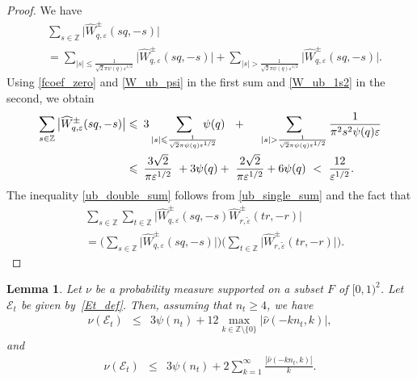 \documentclass[12pt, reqno]{amsart}
\newtheorem{lemma}[thm]{Lemma}
\theoremstyle{definition}
\theoremstyle{remark}
\numberwithin{equation}{section}
\newcommand{\I}{[0,1)}
\def\le{\leqslant} \def\ge{\geqslant}
\def\leq{\leqslant}
\def\geq{\geqslant}
\def \bZ {\mathbb Z}
\def \cE {\mathcal E}
\begin{document}
\begin{proof}
We have
\begin{align*}
&\sum_{s \in \bZ}
\big|\widehat{W}_{q,\varepsilon}^{\pm}(sq,-s)\big| \\
&=
\sum_{|s| \le \frac{1}{\sqrt{2}\pi\psi(q)\varepsilon^{1/2}}}  \big|\widehat{W}_{q,\varepsilon}^{\pm}(sq,-s)\big| +
\sum_{|s| > \frac{1}{\sqrt{2}\pi\psi(q)
		\varepsilon^{1/2}}}     
\big|\widehat{W}_{q,\varepsilon}^{\pm}(sq,-s)\big|.
\end{align*}
Using \eqref{fcoef_zero} and \eqref{W_ub_psi} in the first sum and \eqref{W_ub_1s2}
in the second, we obtain
\begin{equation*} 
\begin{aligned}
	\sum_{s \in \bZ}
	\big|\widehat{W}_{q,\varepsilon}^{\pm}(sq,-s)\big| &\leq    
	\: 3 
	\sum_{|s| \le \frac{1}{\sqrt{2}\pi\psi(q)
			\varepsilon^{1/2}}}   \hspace{-5mm} \psi(q)  \ \ + 
	\hspace*{3ex}  
	\sum_{|s| >
		\frac{1}{\sqrt{2}\pi\psi(q)
			\varepsilon^{1/2}}} 
	\frac{1}{\pi^2 s^2\psi(q)\varepsilon} \\
	&\leq \:
	\frac{3 \sqrt{2}}{\pi\varepsilon^{1/2}}  \ + 3\psi(q) + \ \frac{ 2 \sqrt{2}}{\pi\varepsilon^{1/2}} + 6\psi(q) \ <  \  \frac{12}{\varepsilon^{1/2}}.
\end{aligned}
\end{equation*}
The inequality \eqref{ub_double_sum} follows from \eqref{ub_single_sum} and the fact that 
\begin{align*}
&\sum_{s\in \bZ} \sum_{t\in \bZ}  \big|\widehat{W}_{q,\varepsilon}^{\pm}(sq,-s)\widehat{W}_{r,\tilde{\varepsilon}}^{\pm}(tr,-r)\big|
\\  &=
\Big(\sum_{s \in \bZ} \big|\widehat{W}_{q,\varepsilon}^{\pm}(sq,-s)\big|\Big)
\Big(\sum_{t  \in \bZ} \big|\widehat{W}_{r,\tilde{\varepsilon}}^{\pm}(tr,-r)\big|\Big).
\end{align*}
\end{proof}

\begin{lemma} \label{lem2}
Let $\nu$ be a probability measure supported on a subset $F$ of  $\I^2$. Let  $\cE_{t}$ be given by~\eqref{Et_def}. Then, assuming that $n_t\geq 4$, we have
\begin{eqnarray}
\nu(\cE_{t}) &\leq& 3\psi(n_t) + 12 \max_{k\in\bZ\setminus\{0\}}|\widehat{\nu}(-k n_t,k)| ,
\label{lem2_result1}
\end{eqnarray}
and
\begin{eqnarray}
\nu(\cE_{t}) &\leq& 3\psi(n_t) + 2\sum_{k=1}^{\infty}\frac{|\widehat{\nu}(-k n_t,k)|}{k}.  \label{lem2_result2}
\end{eqnarray}
\end{lemma}
\end{document}
